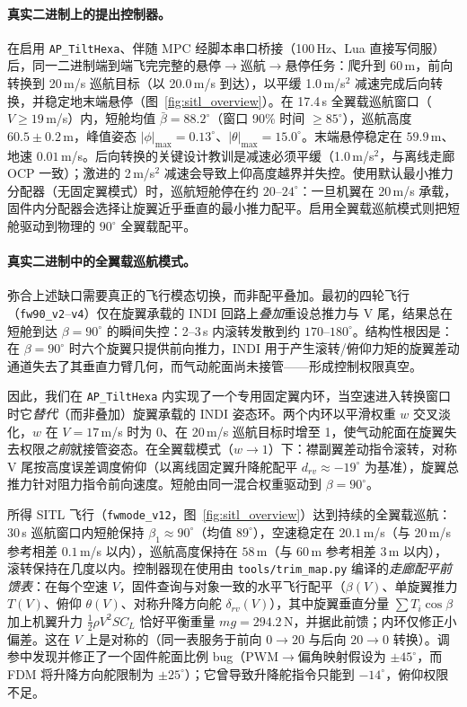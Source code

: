 \documentclass[UTF8,a4paper,11pt]{ctexart}
\begin{document}
\paragraph{真实二进制上的提出控制器。}
在启用 \texttt{AP\_TiltHexa}、伴随 MPC 经脚本串口桥接（100\,Hz、Lua 直接写伺服）后，同一二进制端到端飞完完整的悬停$\to$巡航$\to$悬停任务：爬升到 60\,m，前向转换到 20\,m/s 巡航目标（以 20.0\,m/s 到达），以平缓 1.0\,m/s$^2$ 减速完成后向转换，并稳定地末端悬停（图~\ref{fig:sitl_overview}）。在 17.4\,s 全翼载巡航窗口（$V\ge19$\,m/s）内，短舱均值 $\bar\beta=88.2^\circ$（窗口 90\% 时间 $\ge85^\circ$），巡航高度 $60.5\pm0.2$\,m，峰值姿态 $|\phi|_{\max}=0.13^\circ$、$|\theta|_{\max}=15.0^\circ$。末端悬停稳定在 $59.9$\,m、地速 $0.01$\,m/s。后向转换的关键设计教训是减速必须平缓（1.0\,m/s$^2$，与离线走廊 OCP 一致）；激进的 2\,m/s$^2$ 减速会导致上仰高度越界并失控。使用默认最小推力分配器（无固定翼模式）时，巡航短舱停在约 $20$--$24^\circ$：一旦机翼在 20\,m/s 承载，固件内分配器会选择让旋翼近乎垂直的最小推力配平。启用全翼载巡航模式则把短舱驱动到物理的 $90^\circ$ 全翼载配平。

\paragraph{真实二进制中的全翼载巡航模式。}
弥合上述缺口需要真正的飞行模态切换，而非配平叠加。最初的四轮飞行（\texttt{fw90\_v2}--\texttt{v4}）仅在旋翼承载的 INDI 回路上\emph{叠加}重设总推力与 V 尾，结果总在短舱到达 $\beta=90^\circ$ 的瞬间失控：2--3\,s 内滚转发散到约 $170$--$180^\circ$。结构性根因是：在 $\beta=90^\circ$ 时六个旋翼只提供前向推力，INDI 用于产生滚转/俯仰力矩的旋翼差动通道失去了其垂直力臂几何，而气动舵面尚未接管——形成控制权限真空。

因此，我们在 \texttt{AP\_TiltHexa} 内实现了一个专用固定翼内环，当空速进入转换窗口时它\emph{替代}（而非叠加）旋翼承载的 INDI 姿态环。两个内环以平滑权重 $w$ 交叉淡化，$w$ 在 $V=17$\,m/s 时为 0、在 20\,m/s 巡航目标时增至 1，使气动舵面在旋翼失去权限\emph{之前}就接管姿态。在全翼载模式（$w\to1$）下：襟副翼差动指令滚转，对称 V 尾按高度误差调度俯仰（以离线固定翼升降舵配平 $d_{rv}\approx-19^\circ$ 为基准），旋翼总推力针对阻力指令前向速度。短舱由同一混合权重驱动到 $\beta=90^\circ$。

所得 SITL 飞行（\texttt{fwmode\_v12}，图~\ref{fig:sitl_overview}）达到持续的全翼载巡航：30\,s 巡航窗口内短舱保持 $\beta_1\approx90^\circ$（均值 $89^\circ$），空速稳定在 $20.1$\,m/s（与 20\,m/s 参考相差 $0.1$\,m/s 以内），巡航高度保持在 $58$\,m（与 60\,m 参考相差 $3$\,m 以内），滚转保持在几度以内。控制器现在使用由 \texttt{tools/trim\_map.py} 编译的\emph{走廊配平前馈表}：在每个空速 $V$，固件查询与对象一致的水平飞行配平（$\beta(V)$、单旋翼推力 $T(V)$、俯仰 $\theta(V)$、对称升降方向舵 $\delta_{rv}(V)$），其中旋翼垂直分量 $\sum T_i\cos\beta$ 加上机翼升力 $\tfrac12\rho V^2 S C_L$ 恰好平衡重量 $mg=294.2$\,N，并据此前馈；内环仅修正小偏差。这在 $V$ 上是对称的（同一表服务于前向 $0\to20$ 与后向 $20\to0$ 转换）。调参中发现并修正了一个固件舵面比例 bug（PWM$\to$偏角映射假设为 $\pm45^\circ$，而 FDM 将升降方向舵限制为 $\pm25^\circ$）；它曾导致升降舵指令只能到 $-14^\circ$，俯仰权限不足。
\end{document}
